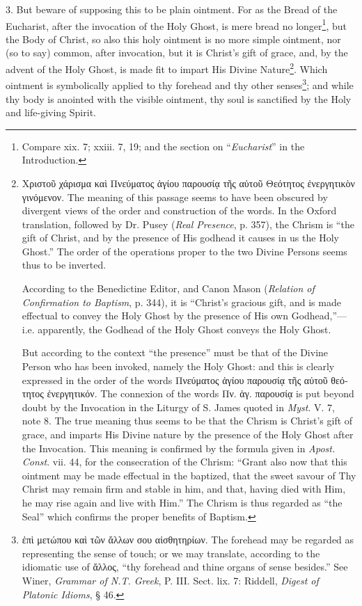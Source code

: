 3. But beware of supposing this to be plain ointment. For as the Bread of the Eucharist, after the invocation of the Holy Ghost, is mere bread no longer\footnote{Compare xix. 7; xxiii. 7, 19; and the section on “\emph{Eucharist}” in the Introduction.}, but the Body of Christ, so also this holy ointment is no more simple ointment, nor (so to say) common, after invocation, but it is Christ’s gift of grace, and, by the advent of the Holy Ghost, is made fit to impart His Divine Nature\footnote{\textgreek{Χριστοῦ χάρισμα καὶ Πνεύματος ἁγίου παρουσίᾳ τῆς αὐτοῦ Θεότητος ἐνεργητικὸν γινόμενον}. The meaning of this passage seems to have been obscured by divergent views of the order and construction of the words. In the Oxford translation, followed by Dr. Pusey (\emph{Real Presence}, p. 357), the Chrism is “the gift of Christ, and by the presence of His godhead it causes in us the Holy Ghost.” The order of the operations proper to the two Divine Persons seems thus to be inverted. \par According to the Benedictine Editor, and Canon Mason (\emph{Relation of Confirmation to Baptism}, p. 344), it is “Christ’s gracious gift, and is made effectual to convey the Holy Ghost by the presence of His own Godhead,”—i.e. apparently, the Godhead of the Holy Ghost conveys the Holy Ghost. \par But according to the context “the presence” must be that of the Divine Person who has been invoked, namely the Holy Ghost: and this is clearly expressed in the order of the words \textgreek{Πνεύματος ἁγίου παρουσίᾳ τῆς αὐτοῦ θεότητος ἐνεργητικόν}. The connexion of the words \textgreek{Πν. ἁγ. παρουσίᾳ} is put beyond doubt by the Invocation in the Liturgy of S. James quoted in \emph{Myst}. V. 7, note 8. The true meaning thus seems to be that the Chrism is Christ’s gift of grace, and imparts His Divine nature by the presence of the Holy Ghost after the Invocation. This meaning is confirmed by the formula given in \emph{Apost. Const}. vii. 44, for the consecration of the Chrism: “Grant also now that this ointment may be made effectual in the baptized, that the sweet savour of Thy Christ may remain firm and stable in him, and that, having died with Him, he may rise again and live with Him.” The Chrism is thus regarded as “the Seal” which confirms the proper benefits of Baptism.}. Which ointment is symbolically applied to thy forehead and thy other senses\footnote{\textgreek{ἐπὶ μετώπου καὶ τῶν ἄλλων σου αἰσθητηρίων}. The forehead may be regarded as representing the sense of touch; or we may translate, according to the idiomatic use of \textgreek{ἄλλος}, “thy forehead and thine organs of sense besides.” See Winer, \emph{Grammar of N.T. Greek}, P. III. Sect. lix. 7: Riddell, \emph{Digest of Platonic Idioms}, § 46.}; and while thy body is anointed with the visible ointment, thy soul is sanctified by the Holy and life-giving Spirit.


